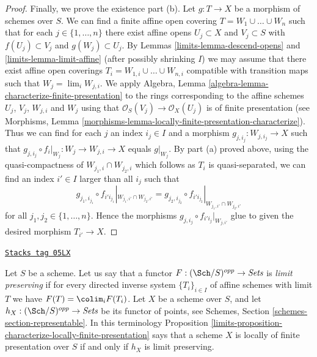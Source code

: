 \begin{proof}
\medskip\noindent
Finally, we prove the existence part (b).
Let $g : T \to X$ be a morphism of schemes over $S$.
We can find a finite affine open covering
$T = W_1 \cup \ldots \cup W_n$ such that for
each $j \in \{1, \ldots, n\}$ there exist affine opens
$U_j \subset X$ and $V_j \subset S$ with $f(U_j) \subset V_j$
and $g(W_j) \subset U_j$. By Lemmas \ref{limits-lemma-descend-opens}
and \ref{limits-lemma-limit-affine}
(after possibly shrinking $I$) we may assume that
there exist affine open coverings $T_i = W_{1, i} \cup \ldots \cup W_{n, i}$
compatible with transition maps such that $W_j = \lim_i W_{j, i}$.
We apply Algebra, Lemma \ref{algebra-lemma-characterize-finite-presentation}
to the rings corresponding to the affine schemes $U_j$, $V_j$, $W_{j, i}$ and
$W_j$ using that $\mathcal{O}_S(V_j) \to \mathcal{O}_X(U_j)$ is of finite
presentation (see Morphisms,
Lemma \ref{morphisms-lemma-locally-finite-presentation-characterize}).
Thus we can find for each $j$ an index $i_j \in I$ and a morphism
$g_{j, i_j} : W_{j, i_j} \to X$ such that
$g_{j, i_j} \circ f_i|_{W_j} : W_j \to W_{j, i} \to X$
equals $g|_{W_j}$. By part (a) proved above, using the quasi-compactness of
$W_{j_1, i} \cap W_{j_2, i}$ which follows as $T_i$ is quasi-separated,
we can find an index $i' \in I$ larger than all $i_j$ such that
$$
g_{j_1, i_{j_1}} \circ f_{i'i_{j_1}}|_{W_{j_1, i'} \cap W_{j_2, i'}} =
g_{j_2, i_{j_2}} \circ f_{i'i_{j_2}}|_{W_{j_1, i'} \cap W_{j_2, i'}}
$$
for all $j_1, j_2 \in \{1, \ldots, n\}$. Hence the morphisms
$g_{j, i_j} \circ f_{i'i_j}|_{W_{j, i'}}$ glue to given the
desired morphism $T_{i'} \to X$.
\end{proof}

\begin{remark}
\label{limits-remark-limit-preserving}
\href{https://stacks.math.columbia.edu/tag/05LX}{\texttt{Stacks tag 05LX}}

Let $S$ be a scheme. Let us say that a functor
$F : (\Sch/S)^{opp} \to \textit{Sets}$ is
{\it limit preserving} if for every directed inverse system
$\{T_i\}_{i \in I}$ of affine schemes with limit $T$ we have
$F(T) = \colim_i F(T_i)$. Let $X$ be a scheme over $S$, and
let $h_X : (\Sch/S)^{opp} \to \textit{Sets}$ be its
functor of points, see
Schemes, Section \ref{schemes-section-representable}.
In this terminology
Proposition \ref{limits-proposition-characterize-locally-finite-presentation}
says that a scheme $X$ is locally of finite presentation over
$S$ if and only if $h_X$ is limit preserving.
\end{remark}

